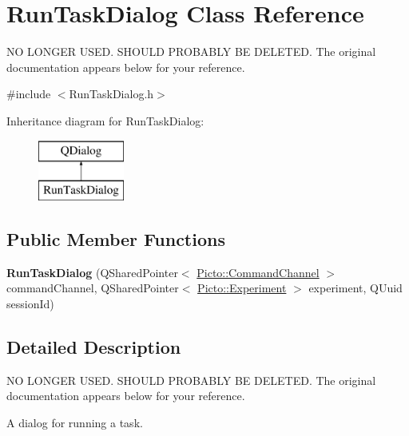 \hypertarget{class_run_task_dialog}{\section{Run\-Task\-Dialog Class Reference}
\label{class_run_task_dialog}
}


N\-O L\-O\-N\-G\-E\-R U\-S\-E\-D. S\-H\-O\-U\-L\-D P\-R\-O\-B\-A\-B\-L\-Y B\-E D\-E\-L\-E\-T\-E\-D. The original documentation appears below for your reference.  




{\ttfamily \#include $<$Run\-Task\-Dialog.\-h$>$}

Inheritance diagram for Run\-Task\-Dialog\-:\begin{figure}[H]
\begin{center}
\leavevmode
\includegraphics[height=2.000000cm]{class_run_task_dialog}
\end{center}
\end{figure}
\subsection*{Public Member Functions}
\begin{DoxyCompactItemize}
\item 
\hypertarget{class_run_task_dialog_a1680df38cae115215be14ad44fc4fe3c}{{\bfseries Run\-Task\-Dialog} (Q\-Shared\-Pointer$<$ \hyperlink{class_picto_1_1_command_channel}{Picto\-::\-Command\-Channel} $>$ command\-Channel, Q\-Shared\-Pointer$<$ \hyperlink{class_picto_1_1_experiment}{Picto\-::\-Experiment} $>$ experiment, Q\-Uuid session\-Id)}\label{class_run_task_dialog_a1680df38cae115215be14ad44fc4fe3c}

\end{DoxyCompactItemize}


\subsection{Detailed Description}
N\-O L\-O\-N\-G\-E\-R U\-S\-E\-D. S\-H\-O\-U\-L\-D P\-R\-O\-B\-A\-B\-L\-Y B\-E D\-E\-L\-E\-T\-E\-D. The original documentation appears below for your reference. 

A dialog for running a task.

